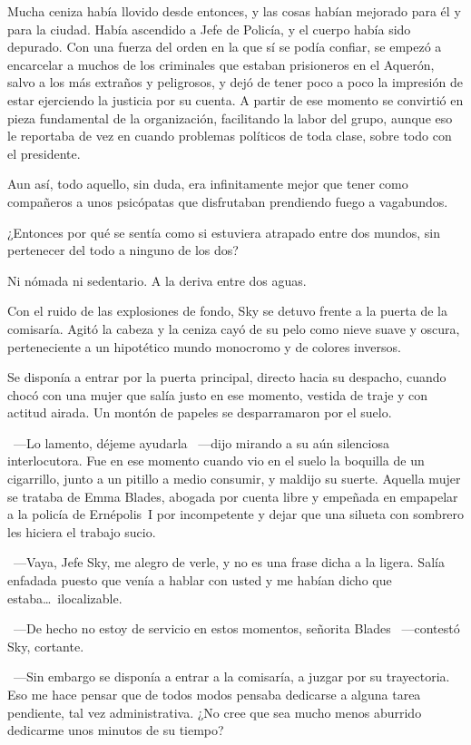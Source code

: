 Mucha ceniza había llovido desde entonces, y las cosas habían mejorado para él y para la ciudad. Había ascendido a Jefe de Policía, y el cuerpo había sido depurado. Con una fuerza del orden en la que sí se podía confiar, se empezó a encarcelar a muchos de los criminales que estaban prisioneros en el Aquerón, salvo a los más extraños y peligrosos, y dejó de tener poco a poco la impresión de estar ejerciendo la justicia por su cuenta. A partir de ese momento se convirtió en pieza fundamental de la organización, facilitando la labor del grupo, aunque eso le reportaba de vez en cuando problemas políticos de toda clase, sobre todo con el presidente.

Aun así, todo aquello, sin duda, era infinitamente mejor que tener como compañeros a unos psicópatas que disfrutaban prendiendo fuego a vagabundos.

¿Entonces por qué se sentía como si estuviera atrapado entre dos mundos, sin pertenecer del todo a ninguno de los dos?

Ni nómada ni sedentario. A la deriva entre dos aguas.

Con el ruido de las explosiones de fondo, Sky se detuvo frente a la puerta de la comisaría. Agitó la cabeza y la ceniza cayó de su pelo como nieve suave y oscura, perteneciente a un hipotético mundo monocromo y de colores inversos.

Se disponía a entrar por la puerta principal, directo hacia su despacho, cuando chocó con una mujer que salía justo en ese momento, vestida de traje y con actitud airada. Un montón de papeles se desparramaron por el suelo.

~---Lo lamento, déjeme ayudarla ~---dijo mirando a su aún silenciosa interlocutora. Fue en ese momento cuando vio en el suelo la boquilla de un cigarrillo, junto a un pitillo a medio consumir, y maldijo su suerte. Aquella mujer se trataba de Emma Blades, abogada por cuenta libre y empeñada en empapelar a la policía de Ernépolis~I por incompetente y dejar que una silueta con sombrero les hiciera el trabajo sucio.

~---Vaya, Jefe Sky, me alegro de verle, y no es una frase dicha a la ligera. Salía enfadada puesto que venía a hablar con usted y me habían dicho que estaba\dots\ ilocalizable.

~---De hecho no estoy de servicio en estos momentos, señorita Blades ~---contestó Sky, cortante.

~---Sin embargo se disponía a entrar a la comisaría, a juzgar por su trayectoria. Eso me hace pensar que de todos modos pensaba dedicarse a alguna tarea pendiente, tal vez administrativa. ¿No cree que sea mucho menos aburrido dedicarme unos minutos de su tiempo?

